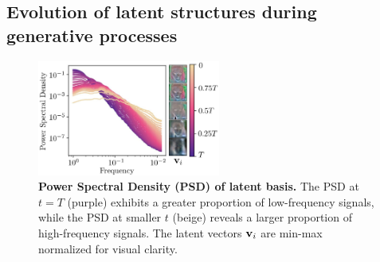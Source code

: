 


\subsection{{Evolution of latent structures during {generative} processes}}
\label{sec:evolution}


\begin{figure}
    \vspace{-1em}
\includegraphics[width=6cm]{figure/PSD.pdf}
    \vspace{-1.5em}
    \caption{\textbf{{Power Spectral Density (PSD) of latent basis.}} {The PSD at $t = T$ (purple) exhibits a greater proportion of low-frequency signals, while the PSD at smaller $t$ (beige) reveals a larger proportion of high-frequency signals. The latent vectors $\mathbf{v}_i$ are min-max normalized for visual clarity.}
    }\label{figure:PSD}
    \vspace{-2em}
\end{figure}


